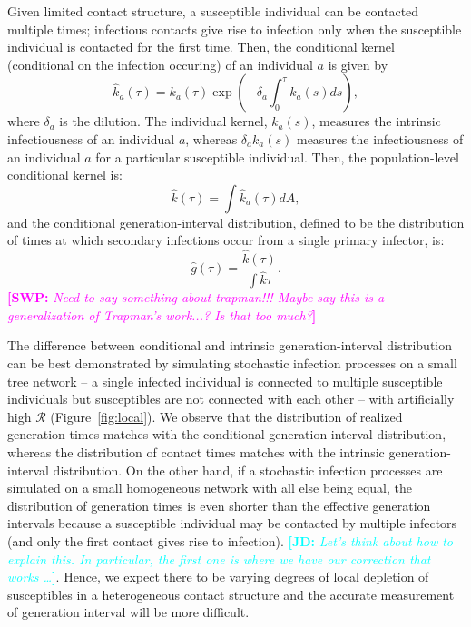 \documentclass{article}
\newcommand{\RR}{\ensuremath{{\mathcal R}}}
\newcommand{\comment}[3]{\textcolor{#1}{\textbf{[#2: }\textsl{#3}\textbf{]}}}
\newcommand{\jd}[1]{\comment{cyan}{JD}{#1}}
\newcommand{\swp}[1]{\comment{magenta}{SWP}{#1}}
\begin{document}
Given limited contact structure, a susceptible individual can be contacted multiple times;
infectious contacts give rise to infection only when the susceptible individual is contacted for the first time.
Then, the conditional kernel (conditional on the infection occuring) of an individual $a$ is given by
\begin{equation}
\hat{k}_a(\tau) = k_a(\tau) \exp \left(- \delta_a \int_0^\tau k_a(s) ds\right),
\end{equation}
where $\delta_a$ is the dilution.
The individual kernel, $k_a(s)$, measures the intrinsic infectiousness of an individual $a$,
whereas $\delta_a k_a(s)$ measures the infectiousness of an individual $a$ for a particular susceptible individual.
Then, the population-level conditional kernel is:
\begin{equation}
\hat{k}(\tau) = \int \hat{k}_a(\tau) dA,
\end{equation}
and the conditional generation-interval distribution, defined to be the distribution of times at which secondary infections occur from a single primary infector, is:
\begin{equation}
\hat{g}(\tau) = \frac{\hat{k}(\tau)}{\int \hat{k} \tau}.
\end{equation}
\swp{Need to say something about trapman!!! Maybe say this is a generalization of Trapman's work...? Is that too much?}

The difference between conditional and intrinsic generation-interval distribution can be best demonstrated by simulating stochastic infection processes on a small tree network -- a single infected individual is connected to multiple susceptible individuals but susceptibles are not connected with each other -- with artificially high $\RR$ (Figure~\ref{fig:local}).
We observe that the distribution of realized generation times matches with the conditional generation-interval distribution, whereas the distribution of contact times matches with the intrinsic generation-interval distribution.
On the other hand, if a stochastic infection processes are simulated on a small homogeneous network with all else being equal, the distribution of generation times is even shorter than the effective generation intervals because a susceptible individual may be contacted by multiple infectors (and only the first contact gives rise to infection).
\jd{Let's think about how to explain this. In particular, the first one is where we have our correction that works \ldots}.
Hence, we expect there to be varying degrees of local depletion of susceptibles in a heterogeneous contact structure and the accurate measurement of generation interval will be more difficult.
\end{document}
